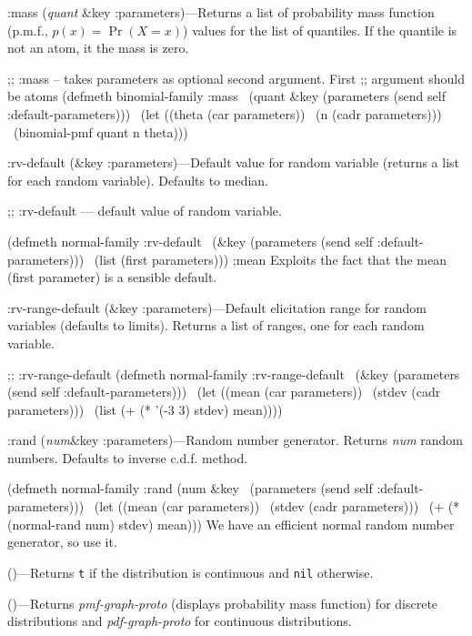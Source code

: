 \meth :mass ({\it quant} \&key :parameters)---Returns a list of
probability mass function (p.m.f., $p(x) = \Pr(X=x)$) values for the
list of quantiles.  If the quantile is not an atom, it 
the mass is zero.

\begincode
;; :mass  -- takes parameters as optional second argument.  First
;; argument should be atoms
(defmeth binomial-family :mass
\         (quant \&key (parameters (send self :default-parameters)))
\   (let ((theta (car parameters))
\	 (n (cadr parameters)))
\     (binomial-pmf quant n theta)))
\endcode


\meth :rv-default (\&key :parameters)---Default value for random
variable  (returns a list for each random variable).  Defaults to
median. 

\begincode
;; :rv-default  --- default value of random variable.

(defmeth normal-family :rv-default
\         (\&key (parameters (send self :default-parameters)))
\   (list (first parameters)))		;mean
\endcode
Exploits the fact that the mean (first parameter) is a sensible
default.  


\meth :rv-range-default (\&key :parameters)---Default elicitation
range for random variables (defaults to limits).  Returns a list of
ranges, one for each random variable.

\begincode
;; :rv-range-default
(defmeth normal-family :rv-range-default
\         (\&key (parameters (send self :default-parameters)))
\   (let ((mean (car parameters))
\	 (stdev (cadr parameters)))
\     (list (+ (* '(-3 3) stdev) mean))))
\endcode

\meth :rand ({\it num}\&key :parameters)---Random number generator.
Returns {\it num\/} random numbers.  Defaults to inverse c.d.f.
method.

\begincode
(defmeth normal-family :rand (num \&key
\			      (parameters (send self :default-parameters)))
\  (let ((mean (car parameters))
\	(stdev (cadr parameters)))
\    (+ (* (normal-rand num) stdev) mean)))
\endcode
We have an efficient normal random number generator, so use it.



 ()---Returns {\tt t\/} if the distribution is continuous
and {\tt nil\/} otherwise.  

 ()---Returns {\it pmf-graph-proto\/} (displays
probability mass function) for discrete distributions and {\it
pdf-graph-proto\/} for continuous distributions.

